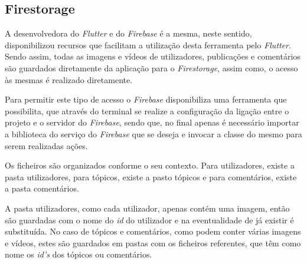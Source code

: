 \subsection{Firestorage}

A desenvolvedora do \textit{Flutter} e do \textit{Firebase} é a mesma, neste sentido, disponibilizou recursos que facilitam a utilização desta ferramenta pelo \textit{Flutter}. Sendo assim, todas as imagens e vídeos de utilizadores, publicações e comentários são guardados diretamente da aplicação para o \textit{Firestorage}, assim como, o acesso às mesmas é realizado diretamente.

Para permitir este tipo de acesso o \textit{Firebase} disponibiliza uma ferramenta que possibilita, que através do terminal se realize a configuração da ligação entre o projeto e o servidor do \textit{Firebase}, sendo que, no final apenas é necessário importar a biblioteca do serviço do \textit{Firebase} que se deseja e invocar a classe do mesmo para serem realizadas ações.

Os ficheiros são organizados conforme o seu contexto. Para utilizadores, existe a pasta utilizadores, para tópicos, existe a pasto tópicos e para comentários, existe a pasta comentários. 


A pasta utilizadores, como cada utilizador, apenas contém uma imagem, então são guardadas com o nome do \textit{id} do utilizador e na eventualidade de já existir é substituída. No caso de tópicos e comentários, como podem conter várias imagens e vídeos, estes são guardados em pastas com os ficheiros referentes, que têm como nome os \emph{id's} dos tópicos ou comentários.

\begin{figure}[htb]%
  \centering
  \qquad
  \label{fig:76}%
\end{figure}